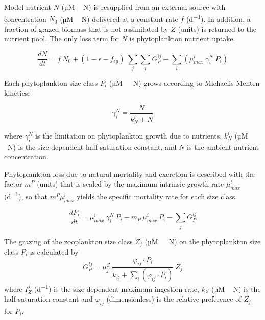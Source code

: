 \documentclass[journal abbreviation, manuscript]{copernicus}
\begin{document}
Model nutrient $N$ (\unit{µM\,N}) is resupplied from an external source with concentration $N_0$ (\unit{µM\,N}) delivered at a constant rate $f$ (\unit{d^{-1}}). In addition, a fraction of grazed biomass that is not assimilated by $Z$ (units) is returned to the nutrient pool. The only loss term for $N$ is phytoplankton nutrient uptake.

\begin{equation}
    \frac{d N}{d t} = 
    f \ N_0 %
    +  (1- \epsilon - f_{eg}) \ \sum_{j} \sum_{i} G_P^{ij} %
    - \sum_{i} ( \mu_{max}^i \ \gamma_i^N \ P_i) %
\end{equation}

Each phytoplankton size class $P_i$ (\unit{µM \ N}) grows according to Michaelis-Menten kinetics:

\begin{equation}
    \gamma_i^N =  \frac{N}{k_N^i + N} 
\end{equation}

where $\gamma_i^N$ is the limitation on phytoplankton growth due to nutrients, $k_N^i$ (\unit{µM\,N}) is the size-dependent half saturation constant, and $N$ is the ambient nutrient concentration.

Phytoplankton loss due to natural mortality and excretion is described with the factor $m^P$ (units) that is scaled by the maximum intrinsic growth rate $\mu_{max}^i$ (\unit{d^{-1}}), so that $m^P \mu_{max}^i$ yields the specific mortality rate for each size class.

\begin{equation}
    \frac{d P_i}{d t} =
    \mu_{max}^i \  \gamma_i^N \   P_i  %
    - m_P  \ \mu_{max}^i \ P_i %
    - \sum_{j} G_P^{ij} %
\end{equation}


The grazing of the zooplankton size class $Z_j$ (\unit{µM \ N}) on the phytoplankton size class $P_i$ is calculated by
\begin{equation}
    G_P^{ij} = \mu_j^Z \ \frac{ \varphi_{ij} \cdot P_i }{ k_Z + \sum_{i}(\varphi_{ij} \cdot P_i) } \ Z_j
\end{equation}
where $I_Z^j$ (\unit{d^{-1}}) is the size-dependent maximum ingestion rate, $k_Z$ (\unit{µM\,N}) is the half-saturation constant and $\varphi_{ij}$ (dimensionless) is the relative preference of $Z_j$ for $P_i$.
\end{document}

